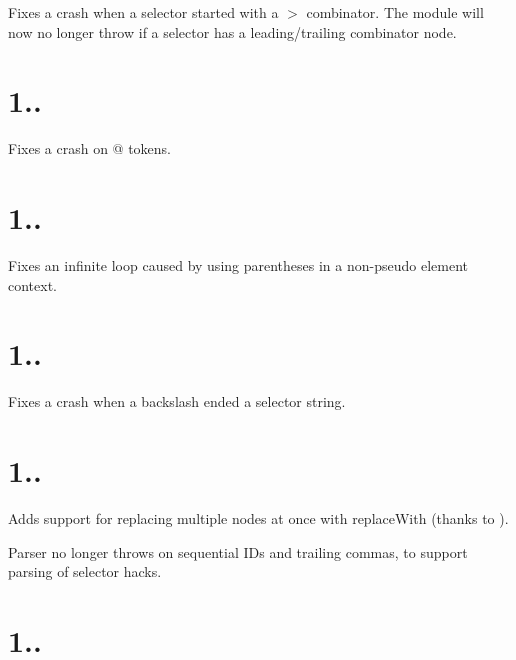 \begin{DoxyItemize}
\item Fixes a crash when a selector started with a {\ttfamily $>$} combinator. The module will now no longer throw if a selector has a leading/trailing combinator node.
\end{DoxyItemize}

\section*{1..}


\begin{DoxyItemize}
\item Fixes a crash on {\ttfamily @} tokens.
\end{DoxyItemize}

\section*{1..}


\begin{DoxyItemize}
\item Fixes an infinite loop caused by using parentheses in a non-\/pseudo element context.
\end{DoxyItemize}

\section*{1..}


\begin{DoxyItemize}
\item Fixes a crash when a backslash ended a selector string.
\end{DoxyItemize}

\section*{1..}


\begin{DoxyItemize}
\item Adds support for replacing multiple nodes at once with {\ttfamily replace\+With} (thanks to ).
\item Parser no longer throws on sequential I\+Ds and trailing commas, to support parsing of selector hacks.
\end{DoxyItemize}

\section*{1..}


